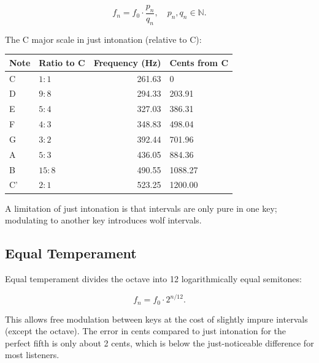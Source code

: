 \documentclass[11pt]{article}
\theoremstyle{definition}
\begin{document}
\begin{equation}
    f_n = f_0 \cdot \frac{p_n}{q_n}, \quad p_n, q_n \in \mathbb{N}.
\end{equation}

The C major scale in just intonation (relative to C):

\begin{center}
\begin{tabular}{llrl}
\toprule
Note & Ratio to C & Frequency (Hz) & Cents from C \\
\midrule
C  & $1:1$   & 261.63 & 0 \\
D  & $9:8$   & 294.33 & 203.91 \\
E  & $5:4$   & 327.03 & 386.31 \\
F  & $4:3$   & 348.83 & 498.04 \\
G  & $3:2$   & 392.44 & 701.96 \\
A  & $5:3$   & 436.05 & 884.36 \\
B  & $15:8$  & 490.55 & 1088.27 \\
C' & $2:1$   & 523.25 & 1200.00 \\
\bottomrule
\end{tabular}
\end{center}

A limitation of just intonation is that intervals are only pure in one key; modulating to another key introduces wolf intervals.

\subsection{Equal Temperament}

Equal temperament divides the octave into 12 logarithmically equal semitones:

\begin{equation}
    f_{n} = f_0 \cdot 2^{n/12}.
\end{equation}

This allows free modulation between keys at the cost of slightly impure intervals (except the octave). The error in cents compared to just intonation for the perfect fifth is only about 2 cents, which is below the just-noticeable difference for most listeners.

\begin{center}
\end{center}
\end{document}
